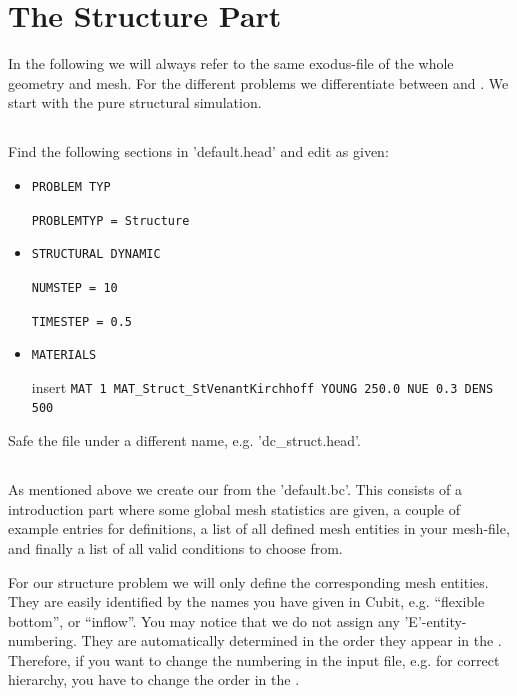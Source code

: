 \section{The Structure Part}

In the following we will always refer to the same exodus-file of the whole
geometry and mesh. For the different problems we differentiate between \head and
\bc. We start with the pure structural simulation.

\subsection{\head}
Find the following sections in 'default.head' and edit as given:

\begin{itemize}
 \item \verb|PROBLEM TYP|

 \verb|PROBLEMTYP = Structure|
 \item \verb|STRUCTURAL DYNAMIC|

 \verb|NUMSTEP = 10|

 \verb|TIMESTEP = 0.5|

 \item \verb|MATERIALS|

  insert \verb|MAT 1 MAT_Struct_StVenantKirchhoff YOUNG 250.0 NUE 0.3 DENS 500|
 
\end{itemize}
Safe the file under a different name, e.g. 'dc\_struct.head'.


\subsection{\bc}
As mentioned above we create our \bc from the 'default.bc'. This consists of a
introduction part where some global mesh statistics are given, a couple of
example entries for definitions, a list of all defined mesh entities in
your mesh-file, and finally a list of all valid \baci{} conditions to choose
from.

For our structure problem we will only define the corresponding mesh entities. They are easily identified by the names you have given in Cubit, e.g. ``flexible bottom'', or ``inflow''. You may notice that we do not assign any 'E'-entity-numbering.
They are automatically determined in the order they appear in the \bc. Therefore, if you want to change the numbering in the \baci{} input file, e.g. for correct hierarchy, you have to change the order in the \bc.

